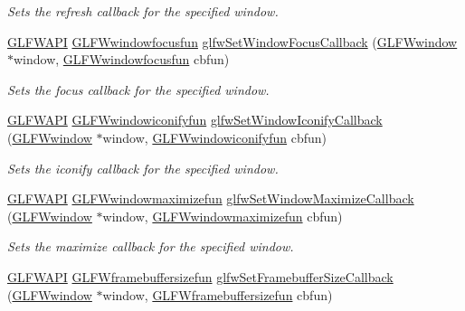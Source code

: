 \begin{DoxyCompactItemize}
\begin{DoxyCompactList}\small\item\em Sets the refresh callback for the specified window. \end{DoxyCompactList}\item 
\mbox{\hyperlink{glfw3_8h_a56da5036b2cc259351ae22fd6439bb47}{G\+L\+F\+W\+A\+PI}} \mbox{\hyperlink{group__window_ga58be2061828dd35080bb438405d3a7e2}{G\+L\+F\+Wwindowfocusfun}} \mbox{\hyperlink{group__window_gac89c6534ba7fbab6f6c68b855656c0d4}{glfw\+Set\+Window\+Focus\+Callback}} (\mbox{\hyperlink{group__window_ga3c96d80d363e67d13a41b5d1821f3242}{G\+L\+F\+Wwindow}} $\ast$window, \mbox{\hyperlink{group__window_ga58be2061828dd35080bb438405d3a7e2}{G\+L\+F\+Wwindowfocusfun}} cbfun)
\begin{DoxyCompactList}\small\item\em Sets the focus callback for the specified window. \end{DoxyCompactList}\item 
\mbox{\hyperlink{glfw3_8h_a56da5036b2cc259351ae22fd6439bb47}{G\+L\+F\+W\+A\+PI}} \mbox{\hyperlink{group__window_gad2d4e4c3d28b1242e742e8268b9528af}{G\+L\+F\+Wwindowiconifyfun}} \mbox{\hyperlink{group__window_ga17cd86946117b56c76397530900519db}{glfw\+Set\+Window\+Iconify\+Callback}} (\mbox{\hyperlink{group__window_ga3c96d80d363e67d13a41b5d1821f3242}{G\+L\+F\+Wwindow}} $\ast$window, \mbox{\hyperlink{group__window_gad2d4e4c3d28b1242e742e8268b9528af}{G\+L\+F\+Wwindowiconifyfun}} cbfun)
\begin{DoxyCompactList}\small\item\em Sets the iconify callback for the specified window. \end{DoxyCompactList}\item 
\mbox{\hyperlink{glfw3_8h_a56da5036b2cc259351ae22fd6439bb47}{G\+L\+F\+W\+A\+PI}} \mbox{\hyperlink{group__window_ga7269a3d1cb100c0081f95fc09afa4949}{G\+L\+F\+Wwindowmaximizefun}} \mbox{\hyperlink{group__window_gab9fdd6d79d819b4850946952a9b6259b}{glfw\+Set\+Window\+Maximize\+Callback}} (\mbox{\hyperlink{group__window_ga3c96d80d363e67d13a41b5d1821f3242}{G\+L\+F\+Wwindow}} $\ast$window, \mbox{\hyperlink{group__window_ga7269a3d1cb100c0081f95fc09afa4949}{G\+L\+F\+Wwindowmaximizefun}} cbfun)
\begin{DoxyCompactList}\small\item\em Sets the maximize callback for the specified window. \end{DoxyCompactList}\item 
\mbox{\hyperlink{glfw3_8h_a56da5036b2cc259351ae22fd6439bb47}{G\+L\+F\+W\+A\+PI}} \mbox{\hyperlink{group__window_ga3e218ef9ff826129c55a7d5f6971a285}{G\+L\+F\+Wframebuffersizefun}} \mbox{\hyperlink{group__window_gad766bcdb4465f9c6c62e5d8ca7cfba56}{glfw\+Set\+Framebuffer\+Size\+Callback}} (\mbox{\hyperlink{group__window_ga3c96d80d363e67d13a41b5d1821f3242}{G\+L\+F\+Wwindow}} $\ast$window, \mbox{\hyperlink{group__window_ga3e218ef9ff826129c55a7d5f6971a285}{G\+L\+F\+Wframebuffersizefun}} cbfun)

\end{DoxyCompactItemize}
